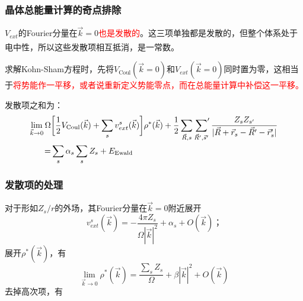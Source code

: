 \documentclass[cjk,slidestop,handout,compress,mathserif,blue]{beamer}	%
\newcommand{\upcite}[1]{\hspace{0ex}\textsuperscript{\cite{#1}}} %
\begin{document}
\frame
{
	\frametitle{晶体总能量计算的奇点排除}
	$V_{ext}$的\textrm{Fourier}分量在$\vec k=0$\textcolor{red}{也是发散的}。这三项单独都是发散的，但整个体系处于电中性，所以这些发散项相互抵消，是一常数。\upcite{Xie_Lu}

求解\textrm{Kohn-Sham}方程时，先将$V_{\mathrm{Coul}}(\vec k=0)$和$V_{ext}(\vec k=0)$同时置为零，这相当于\textcolor{red}{将势能作一平移，或者说重新定义势能零点，而在总能量计算中补偿这一平移。}

	发散项之和为：
	\begin{displaymath}
		\begin{aligned}
			\lim_{\vec k\rightarrow0}\Omega&\bigg[\dfrac12V_{\mathrm{Coul}}(\vec k)+\sum_sv_{ext}^s(\vec k)\bigg]\rho^{\ast}(\vec k)+\dfrac12\sum_{\vec R,s}\sideset{}{^{\prime}}\sum_{\vec R^{\prime},\vec s^{\prime}}\dfrac{Z_sZ_{s^{\prime}}}{|\vec R+\vec r_s-\vec R^{\prime}-\vec r_s^{\prime}|}\\
			=&\sum_s\alpha_s\sum_sZ_s+E_{\mathrm{Ewald}}
		\end{aligned}
	\end{displaymath}
}

\frame
{
	\frametitle{发散项的处理}
	对于形如$Z_s/r$的外场，其\textrm{Fourier}分量在$\vec k=0$附近展开
	\begin{displaymath}
		v_{ext}^s(\vec k)=-\dfrac{4\pi Z_s}{\Omega|\vec k|^2}+\alpha_s+O(\vec k)； 
	\end{displaymath}
	展开$\rho^{\ast}(\vec k)$，有
	\begin{displaymath}
		\lim_{\vec k\rightarrow 0}\rho^{\ast}(\vec k)=\dfrac{\sum_sZ_s}{\Omega}+\beta|\vec k|^2+O(\vec k)
	\end{displaymath}
去掉高次项，有
\fontsize{8.5pt}{5.2pt}
}
\end{document}
